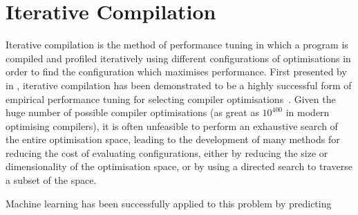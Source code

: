 \section{Iterative Compilation}

Iterative compilation is the method of performance tuning in which a
program is compiled and profiled iteratively using different
configurations of optimisations in order to find the configuration
which maximises performance. First presented by \citeauthor{Bodin1998}
in \citeyear{Bodin1998}, iterative compilation has been demonstrated
to be a highly successful form of empirical performance tuning for
selecting compiler optimisations~\cite{Bodin1998}. Given the huge
number of possible compiler optimisations (as great as $10^{400}$ in
modern optimising compilers), it is often unfeasible to perform an
exhaustive search of the entire optimisation space, leading to the
development of many methods for reducing the cost of evaluating
configurations, either by reducing the size or dimensionality of the
optimisation space, or by using a directed search to traverse a subset
of the space.

Machine learning has been successfully applied to this problem by
predicting~\cite{Stephenson2003}


%
%



